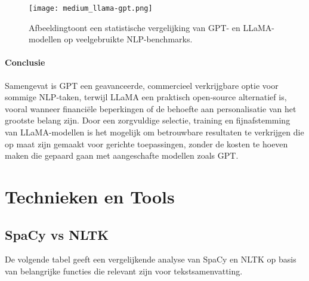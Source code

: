 \begin{figure}[hbt!]
    \texttt{[image: medium\_llama-gpt.png]}
    \caption[13F voorbeeld 4]{\label{fig:gpt-vs-llama-benchmarks} Afbeeldingtoont een statistische vergelijking van GPT- en LLaMA-modellen op veelgebruikte NLP-benchmarks.}
\end{figure}
 
\paragraph{Conclusie}

Samengevat is GPT een geavanceerde, commercieel verkrijgbare optie voor sommige NLP-taken, terwijl LLaMA een praktisch open-source alternatief is, vooral wanneer financiële beperkingen of de behoefte aan personalisatie van het grootste belang zijn. Door een zorgvuldige selectie, training en fijnafstemming van LLaMA-modellen is het mogelijk om betrouwbare resultaten te verkrijgen die op maat zijn gemaakt voor gerichte toepassingen, zonder de kosten te hoeven maken die gepaard gaan met aangeschafte modellen zoals GPT.












\section{Technieken en Tools}
\subsection{SpaCy vs NLTK}
De volgende tabel geeft een vergelijkende analyse van SpaCy en NLTK op basis van belangrijke functies die relevant zijn voor tekstsamenvatting.

